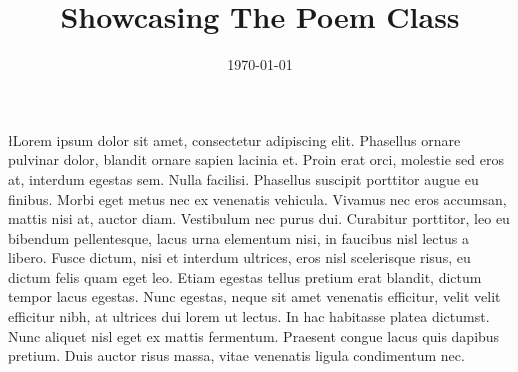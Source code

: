 \documentclass{poem}
\title     {Showcasing The Poem Class}
\date      {\today}
\begin{document}
\l{L}orem ipsum dolor sit amet, consectetur adipiscing elit. Phasellus ornare pulvinar dolor, blandit ornare sapien lacinia et. Proin erat orci, molestie sed eros at, interdum egestas sem. Nulla facilisi. Phasellus suscipit porttitor augue eu finibus. Morbi eget metus nec ex venenatis vehicula. Vivamus nec eros accumsan, mattis nisi at, auctor diam. Vestibulum nec purus dui. Curabitur porttitor, leo eu bibendum pellentesque, lacus urna elementum nisi, in faucibus nisl lectus a libero. Fusce dictum, nisi et interdum ultrices, eros nisl scelerisque risus, eu dictum felis quam eget leo. Etiam egestas tellus pretium erat blandit, dictum tempor lacus egestas. Nunc egestas, neque sit amet venenatis efficitur, velit velit efficitur nibh, at ultrices dui lorem ut lectus. In hac habitasse platea dictumst. Nunc aliquet nisl eget ex mattis fermentum. Praesent congue lacus quis dapibus pretium. Duis auctor risus massa, vitae venenatis ligula condimentum nec.
\end{document}
